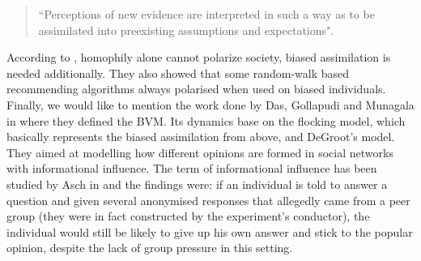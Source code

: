 \documentclass[12pt,a4paper,twoside]{article}
\begin{document}
\begin{quote}
	``Perceptions of new evidence are interpreted in such a way as to be assimilated into preexisting assumptions and expectations".
\end{quote}
According to \cite{Dandekar2013}, homophily alone cannot polarize society, biased assimilation is needed additionally. They also showed that some random-walk based recommending algorithms always polarised when used on biased individuals. Finally, we would like to mention the work done by Das, Gollapudi and Munagala in \cite{Das2014} where they defined the \ac{BVM}. Its dynamics base on the flocking model, which basically represents the biased assimilation from above, and DeGroot's model. They aimed at modelling how different opinions are formed in social networks with informational influence. The term of informational influence has been studied by Asch in \cite{Asch1955} and the findings were: if an individual is told to answer a question and given several anonymised responses that allegedly came from a peer group (they were in fact constructed by the experiment's conductor), the individual would still be likely to give up his own answer and stick to the popular opinion, despite the lack of group pressure in this setting.
\end{document}
